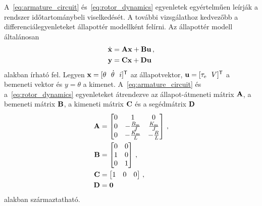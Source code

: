 A~\eqref{eq:armature_circuit} és~\eqref{eq:rotor_dynamics} egyenletek egyértelműen leírják a 
rendszer időtartománybeli viselkedését.
A további vizsgálathoz kedvezőbb a differenciálegyenleteket állapottér modellként felírni.
Az állapottér modell általánosan~\cite{kalman1963mathematical}
\begin{equation}\label{eq:state_space_generic}
\begin{split}
    \dot{\mathbf{x}} &= \mathbf{A} \mathbf{x} + \mathbf{B} \mathbf{u}\,,\\
    \mathbf{y} &= \mathbf{C} \mathbf{x} + \mathbf{D} \mathbf{u}
\end{split}
\end{equation} 
alakban írható fel. Legyen \(\mathbf{x} = [\theta~~\dot \theta~~i]^{\mathsf T}\) az állapotvektor, 
\(\mathbf{u} = [\tau_{\mathrm{e}}~~V]^{\mathsf T}\) a bemeneti vektor és \(y = \theta\) a kimenet.
A~\eqref{eq:armature_circuit} és a~\eqref{eq:rotor_dynamics} egyenleteket átrendezve 
az állapot-átmeneti mátrix \(\mathbf{A}\), a bemeneti mátrix \(\mathbf{B}\), a kimeneti mátrix \(\mathbf{C}\) és a segédmátrix \(\mathbf{D}\) 
\begin{equation}\label{eq:state_space}
    \begin{split}
        \mathbf{A} &= 
        \begin{bmatrix}
            0 & 1 & 0 \\
            0 & -\frac{B_{\mathrm{m}}}{J} & \frac{K_{\mathrm{m}}}{J} \\
            0 & -\frac{K_{\mathrm{m}}}{L} & -\frac{R}{L} \\
        \end{bmatrix}\,,\\
        \mathbf{B} &=
        \begin{bmatrix}
            0 & 0 \\
            1 & 0 \\
            0 & 1 \\
        \end{bmatrix}\,,\\
        \mathbf{C} &=
        \begin{bmatrix}
            1 & 0 & 0 \\
        \end{bmatrix}\,,\\
        \mathbf{D} &= \mathbf{0}
    \end{split}
\end{equation}
alakban származtatható.


